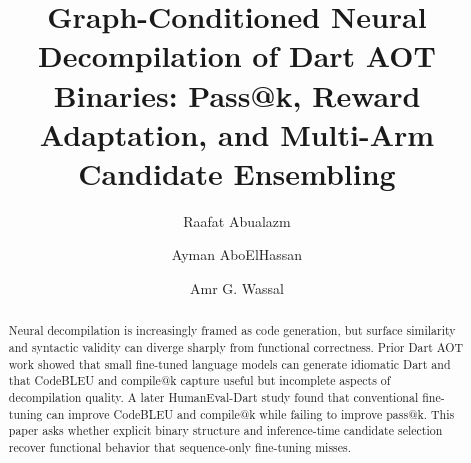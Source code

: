 \documentclass[11pt]{article}
\title{Graph-Conditioned Neural Decompilation of Dart AOT Binaries: Pass@k, Reward Adaptation, and Multi-Arm Candidate Ensembling}
\author{Raafat Abualazm \and Ayman AboElHassan \and Amr G. Wassal}
\date{}
\begin{document}
\maketitle

\begin{abstract}
Neural decompilation is increasingly framed as code generation, but surface similarity and syntactic validity can diverge sharply from functional correctness. Prior Dart AOT work showed that small fine-tuned language models can generate idiomatic Dart and that CodeBLEU and compile@k capture useful but incomplete aspects of decompilation quality. A later HumanEval-Dart study found that conventional fine-tuning can improve CodeBLEU and compile@k while failing to improve pass@k. This paper asks whether explicit binary structure and inference-time candidate selection recover functional behavior that sequence-only fine-tuning misses.


\end{abstract}
\end{document}
